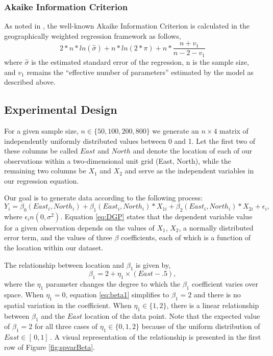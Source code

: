 \documentclass{article}\usepackage[]{graphicx}\usepackage[]{color}
\begin{document}
\subsubsection{Akaike Information Criterion}
As noted in \citep{Fotheringham2002}, the well-known Akaike Information Criterion is calculated in the geographically weighted regression framework as follows,
\begin{equation}\label{eq:AIC}
  2*n*ln(\hat{\sigma}) + n*ln(2*\pi) + 
    n*\frac{n + v_1}{n - 2 - v_1}
    \end{equation}
where $\hat{\sigma}$ is the estimated standard error of the regression, n is the sample size, and $v_1$ remains the ``effective number of parameters'' estimated by the model as described above.

\subsection{Experimental Design}

For a given sample size, $n \in \{50, 100, 200, 800\}$ we generate an $n \times 4$ matrix of independently uniformly distributed values between 0 and 1. Let the first two of these columns be called $East$ and $North$ and denote the location of each of our observations within a two-dimensional unit grid (East, North), while the remaining two columns be $X_1$ and $X_2$ and serve as the independent variables in our regression equation.

Our goal is to generate data according to the following process:
\begin{equation} \label{eq:DGP}
Y_i = \beta _0 (East_i, North_i) + \beta _1 (East_i, North_i)*X_{1i} + \beta _2 (East_i, North_i) * X_{2i} + \epsilon _i ,
\end{equation}
where $\epsilon _i n(0, \sigma ^2)$.
Equation \ref{eq:DGP} states that the dependent variable value for a given observation depends on the values of $X_1$, $X_2$, a normally distributed error term, and the values of three $\beta$ coefficients, each of which is a function of the location within our dataset.

The relationship between location and $\beta _1$ is given by,
\begin{equation}\label{eq:beta1}
\beta _1 =  2 + \eta _1 \times (East - .5) ,
\end{equation}
where the $\eta _1$ parameter changes the degree to which the $\beta _1$ coefficient varies over space. When $\eta _1 =0$, equation \eqref{eq:beta1} simplifies to $\beta _1 =2$ and there is no spatial variation in the coefficient. When $\eta _1 \in \{1, 2\}$, there is a linear relationship between $\beta _1$ and the $East$ location of the data point. Note that the expected value of $\beta _1 = 2$ for all three cases of $\eta _1 \in \{0, 1, 2\}$ because of the uniform distribution of $East \in [\, 0, 1]\,$. A visual representation of the relationship is presented in the first row of Figure \ref{fig:spvarBeta}.
\end{document}
